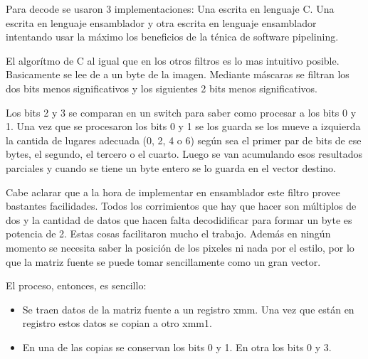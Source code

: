 \begin{comment}
	- Comparación c y asm.
		- La mayor diferencia es que se levanta de a más.
	- El tiempo en asm es súper constante porque sólo depende de size. En c mas o menos, explicar por qué.
	- Hay un caso límite. Explicar. Aunque se trata como un chorizo.
	- Explicar optimización del acceso a memoria.
	- Explicar por qué no se puede hacer tanta ejcución fuera de orden. Hay dependencia de datos.
	- ¿Que pesa más?¿Procesamiento o acceso a memoria?

\end{comment}


	Para decode se usaron 3 implementaciones: Una escrita en lenguaje C.
Una escrita en lenguaje ensamblador y otra escrita en lenguaje ensamblador
intentando usar la máximo los beneficios de la ténica de software pipelining.

	El algorítmo de C al igual que en los otros filtros es lo mas intuitivo posible.
Basicamente se lee de a un byte de la imagen. Mediante máscaras se filtran los dos bits
menos significativos y los siguientes 2 bits menos significativos.

	Los bits 2 y 3 se comparan en un switch para saber como procesar
a los bits 0 y 1. Una vez que se procesaron los bits 0 y 1 se los guarda se los
mueve a izquierda la cantida de lugares adecuada (0, 2, 4 o 6) según sea el primer
par de bits de ese bytes, el segundo, el tercero o el cuarto. Luego se van acumulando
esos resultados parciales y cuando se tiene un byte entero se lo guarda en el vector
destino.

	Cabe aclarar que a la hora de implementar en ensamblador este filtro provee bastantes
facilidades. Todos los corrimientos que hay que hacer son múltiplos de dos y la cantidad
de datos que hacen falta decodidificar para formar un byte es potencia de 2. Estas
cosas facilitaron mucho el trabajo. Además en ningún momento se necesita saber la
posición de los pixeles ni nada por el estilo, por lo que la matriz fuente se puede
tomar sencillamente como un gran vector.

	El proceso, entonces, es sencillo:

\begin{itemize}

	\item Se traen datos de la matriz fuente a un registro xmm. Una vez que
	están en registro estos datos se copian a otro xmm1.

	\item En una de las copias se conservan los bits 0 y 1. En otra los bits 0 y 3.

	\

\end{itemize}
